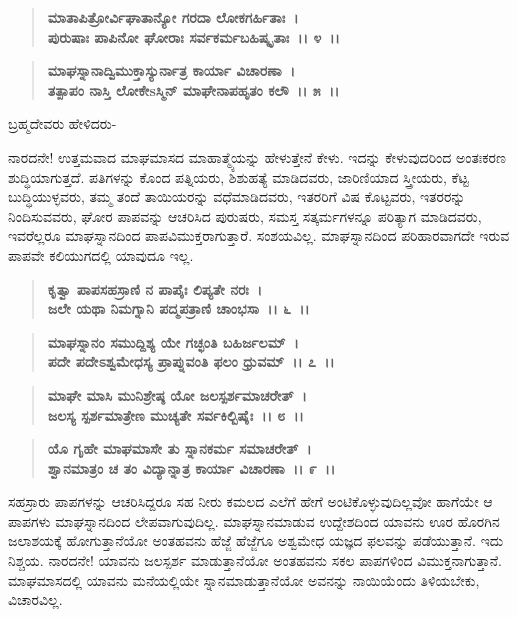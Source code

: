 \begin{verse}
\textbf{ಮಾತಾಪಿತ್ರೋರ್ವಿಘಾತಾನ್ಯೋ ಗರದಾ ಲೋಕಗರ್ಹಿತಾಃ~।}\\\textbf{ಪುರುಷಾಃ ಪಾಪಿನೋ ಘೋರಾಃ ಸರ್ವಕರ್ಮಬಹಿಷ್ಕೃತಾಃ~।। ೪~।। }
\end{verse}

\begin{verse}
\textbf{ಮಾಘಸ್ನಾನಾದ್ವಿಮುಕ್ತಾಸ್ಯುರ್ನಾತ್ರ ಕಾರ್ಯಾ ವಿಚಾರಣಾ~।}\\\textbf{ತತ್ಪಾಪಂ ನಾಸ್ತಿ ಲೋಕೇsಸ್ಮಿನ್ ಮಾಘೇನಾಪಹೃತಂ ಕಲೌ~।। ೫~।।}
\end{verse}

\begin{flushleft}
ಬ್ರಹ್ಮದೇವರು ಹೇಳಿದರು-
\end{flushleft}

ನಾರದನೇ! ಉತ್ತಮವಾದ ಮಾಘಮಾಸದ ಮಾಹಾತ್ಮ್ಯೆಯನ್ನು ಹೇಳುತ್ತೇನೆ ಕೇಳು. ಇದನ್ನು ಕೇಳುವುದರಿಂದ ಅಂತಃಕರಣ ಶುದ್ಧಿಯಾಗುತ್ತದೆ. ಪತಿಗಳನ್ನು ಕೊಂದ ಪತ್ನಿಯರು, ಶಿಶುಹತ್ಯೆ ಮಾಡಿದವರು, ಜಾರಿಣಿಯಾದ ಸ್ತ್ರೀಯರು, ಕೆಟ್ಟ ಬುದ್ಧಿಯುಳ್ಳವರು, ತಮ್ಮ ತಂದೆ ತಾಯಿಯರನ್ನು ವಧೆಮಾಡಿದವರು, ಇತರರಿಗೆ ವಿಷ ಕೊಟ್ಟವರು, ಇತರರನ್ನು ನಿಂದಿಸುವವರು, ಘೋರ ಪಾಪವನ್ನು ಆಚರಿಸಿದ ಪುರುಷರು, ಸಮಸ್ತ ಸತ್ಕರ್ಮಗಳನ್ನೂ ಪರಿತ್ಯಾಗ ಮಾಡಿದವರು, ಇವರೆಲ್ಲರೂ ಮಾಘಸ್ನಾನದಿಂದ ಪಾಪವಿಮುಕ್ತರಾಗುತ್ತಾರೆ. ಸಂಶಯವಿಲ್ಲ. ಮಾಘಸ್ನಾನದಿಂದ ಪರಿಹಾರವಾಗದೇ ಇರುವ ಪಾಪವೇ ಕಲಿಯುಗದಲ್ಲಿ ಯಾವುದೂ ಇಲ್ಲ.

\begin{verse}
\textbf{ಕೃತ್ವಾ ಪಾಪಸಹಸ್ರಾಣಿ ನ ಪಾಪೈಃ ಲಿಪ್ಯತೇ ನರಃ~।}\\\textbf{ಜಲೇ ಯಥಾ ನಿಮಗ್ನಾನಿ ಪದ್ಮಪತ್ರಾಣಿ ಚಾಂಭಸಾ~।। ೬~।। }
\end{verse}

\begin{verse}
\textbf{ಮಾಘಸ್ನಾನಂ ಸಮುದ್ದಿಶ್ಯ ಯೇ ಗಚ್ಛಂತಿ ಬಹಿರ್ಜಲಮ್~।}\\\textbf{ಪದೇ ಪದೇಽಶ್ವಮೇಧಸ್ಯ ಪ್ರಾಪ್ನುವಂತಿ ಫಲಂ ಧ್ರುವಮ್~।। ೭~।। }
\end{verse}

\begin{verse}
\textbf{ಮಾಘೇ ಮಾಸಿ ಮುನಿಶ್ರೇಷ್ಠ ಯೋ ಜಲಸ್ಪರ್ಶಮಾಚರೇತ್~।}\\\textbf{ಜಲಸ್ಯ ಸ್ಪರ್ಶಮಾತ್ರೇಣ ಮುಚ್ಯತೇ ಸರ್ವಕಿಲ್ಬಿಷೈಃ~।। ೮~।। }
\end{verse}

\begin{verse}
\textbf{ಯೊ ಗೃಹೇ ಮಾಘಮಾಸೇ ತು ಸ್ನಾನಕರ್ಮ ಸಮಾಚರೇತ್~।}\\\textbf{ಶ್ವಾನಮಾತ್ರಂ ಚ ತಂ ವಿದ್ಯಾನ್ನಾತ್ರ ಕಾರ್ಯಾ ವಿಚಾರಣಾ~।। ೯~।।}
\end{verse}

ಸಹಸ್ರಾರು ಪಾಪಗಳನ್ನು ಆಚರಿಸಿದ್ದರೂ ಸಹ ನೀರು ಕಮಲದ ಎಲೆಗೆ ಹೇಗೆ ಅಂಟಿಕೊಳ್ಳುವುದಿಲ್ಲವೋ ಹಾಗೆಯೇ ಆ ಪಾಪಗಳು ಮಾಘಸ್ನಾನದಿಂದ ಲೇಪವಾಗುವುದಿಲ್ಲ. ಮಾಘಸ್ನಾನ\-ಮಾಡುವ ಉದ್ದೇಶದಿಂದ ಯಾವನು ಊರ ಹೊರಗಿನ ಜಲಾಶಯಕ್ಕೆ ಹೋಗುತ್ತಾನೆಯೋ ಅಂತಹವನು ಹೆಜ್ಜೆ ಹೆಜ್ಜೆಗೂ ಅಶ್ವಮೇಧ ಯಜ್ಞದ ಫಲವನ್ನು ಪಡೆಯುತ್ತಾನೆ. ಇದು ನಿಶ್ಚಯ. ನಾರದನೇ! ಯಾವನು ಜಲಸ್ಪರ್ಶ ಮಾಡುತ್ತಾನೆಯೋ ಅಂತಹವನು ಸಕಲ ಪಾಪಗಳಿಂದ ವಿಮುಕ್ತನಾಗುತ್ತಾನೆ. ಮಾಘಮಾಸದಲ್ಲಿ ಯಾವನು ಮನೆಯಲ್ಲಿಯೇ ಸ್ನಾನಮಾಡುತ್ತಾನೆಯೋ ಅವನನ್ನು ನಾಯಿಯೆಂದು ತಿಳಿಯಬೇಕು, ವಿಚಾರವಿಲ್ಲ.


